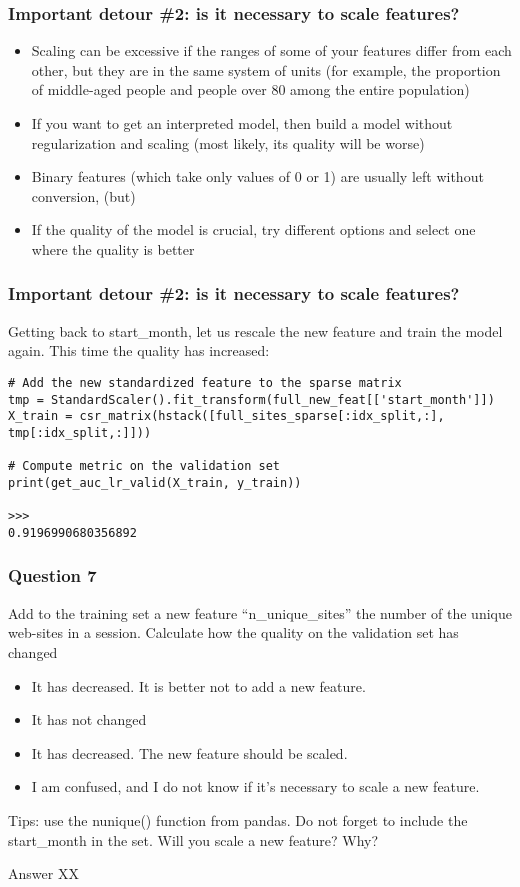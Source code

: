 \begin{frame}[fragile]\frametitle{Important detour \#2: is it necessary to scale features?}

\begin{itemize}
\item Scaling can be excessive if the ranges of some of your features differ from each other, but they are in the same system of units (for example, the proportion of middle-aged people and people over 80 among the entire population)
\item If you want to get an interpreted model, then build a model without regularization and scaling (most likely, its quality will be worse)
\item Binary features (which take only values of 0 or 1) are usually left without conversion, (but)
\item If the quality of the model is crucial, try different options and select one where the quality is better
\end{itemize}

\end{frame}

\begin{frame}[fragile]\frametitle{Important detour \#2: is it necessary to scale features?}
Getting back to start\_month, let us rescale the new feature and train the model again. This time the quality has increased:

\begin{lstlisting}
# Add the new standardized feature to the sparse matrix
tmp = StandardScaler().fit_transform(full_new_feat[['start_month']])
X_train = csr_matrix(hstack([full_sites_sparse[:idx_split,:], tmp[:idx_split,:]]))

# Compute metric on the validation set
print(get_auc_lr_valid(X_train, y_train))

>>>
0.9196990680356892
\end{lstlisting}
\end{frame}

\begin{frame}[fragile]\frametitle{Question 7}
Add to the training set a new feature ``n\_unique\_sites'' the number of the unique web-sites in a session. Calculate how the quality on the validation set has changed
\begin{itemize}
\item It has decreased. It is better not to add a new feature.
\item It has not changed
\item It has decreased. The new feature should be scaled.
\item I am confused, and I do not know if it's necessary to scale a new feature.
\end{itemize}
Tips: use the nunique() function from pandas. Do not forget to include the start\_month in the set. Will you scale a new feature? Why?

Answer XX
\end{frame}

